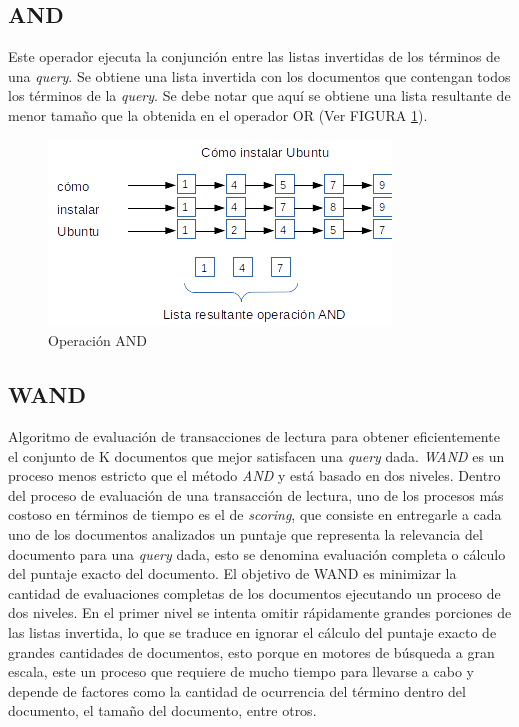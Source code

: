 \subsection{AND}
\label{marco:and}
Este operador ejecuta la conjunción entre las listas invertidas de los términos de una \textit{query}. Se obtiene una lista invertida con los documentos que contengan todos los términos de la \textit{query}. Se debe notar que aquí se obtiene una lista resultante de menor tamaño que la obtenida en el operador OR (Ver FIGURA \ref{fig:ANDoperation}).

\begin{figure}[tp]
\centering
\includegraphics[scale=.75]{images/ANDoperation.png}
\caption{Operaci\'on AND}
\label{fig:ANDoperation}
\end{figure}


\subsection{WAND}
\label{marco:wand}
Algoritmo de evaluación de transacciones de lectura para obtener eficientemente el conjunto de K documentos que mejor satisfacen una \textit{query} dada. \textit{WAND} \citep{Broder:2003} es un proceso menos estricto que el método \textit{AND} y está basado en dos niveles. Dentro del proceso de evaluación de una transacción de lectura, uno de los procesos más costoso en términos de tiempo es el de \textit{scoring}, que consiste en entregarle a cada uno de los documentos analizados un puntaje que representa la relevancia del documento para una \textit{query} dada, esto se denomina evaluación completa o cálculo del puntaje exacto del documento. El objetivo de WAND es minimizar la cantidad de evaluaciones completas de los documentos ejecutando un proceso de dos niveles. En el primer nivel se intenta omitir rápidamente grandes porciones de las listas invertida, lo que se traduce en ignorar el cálculo del puntaje exacto de grandes cantidades de documentos, esto porque en motores de búsqueda a gran escala, este un proceso que requiere de mucho tiempo para llevarse a cabo y depende de factores como la cantidad de ocurrencia del término dentro del documento, el tamaño del documento, entre otros.  

